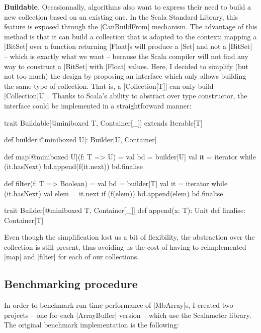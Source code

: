 \textbf{Buildable}. Occasionnally, algorithms also want to express their need to build a new collection based on an existing one. In the Scala Standard Library, this feature is exposed through the |CanBuildFrom| mechanism. The advantage of this method is that it can build a collection that is adapted to the context: mapping a |BitSet| over a function returning |Float|s will produce a |Set| and not a |BitSet| -- which is exactly what we want -- because the Scala compiler will not find any way to construct a |BitSet| with |Float| values. Here, I decided to simplify (but not too much) the design by proposing an interface which only allows building the same type of collection. That is, a |Collection[T]| can only build |Collection[U]|. Thanks to Scala's ability to abstract over type constructor, the interface could be implemented in a straightforward manner: 

\begin{lstlisting-nobreak}
trait Buildable[@miniboxed T, Container[_]] extends Iterable[T] {
  def builder[@miniboxed U]: Builder[U, Container]

  def map[@miniboxed U](f: T => U) = {
    val bd = builder[U]
    val it = iterator
    while (it.hasNext) {
      bd.append(f(it.next))
    }
    bd.finalise
  }

  def filter(f: T => Boolean) = {
    val bd = builder[T]
    val it = iterator
    while (it.hasNext) {
      val elem = it.next
      if (f(elem)) {
        bd.append(elem)
      }
    }
    bd.finalise
  }
}

trait Builder[@miniboxed T, Container[_]] {
  def append(x: T): Unit
  def finalise: Container[T]
}
\end{lstlisting-nobreak}

Even though the simplification lost us a bit of flexibility, the abstraction over the collection is still present, thus avoiding us the cost of having to reimplemented |map| and |filter| for each of our collections.

\subsection{Benchmarking procedure}

In order to benchmark run time performance of |MbArray|s, I created two projects -- one for each |ArrayBuffer| version -- which use the Scalameter library. The original benchmark implementation is the following:

